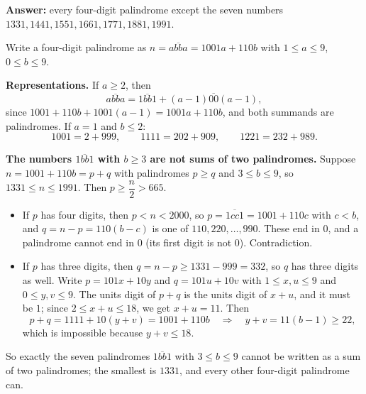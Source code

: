 \textbf{Answer:} every four-digit palindrome except the seven numbers $1331, 1441, 1551, 1661, 1771, 1881, 1991$.

Write a four-digit palindrome as $n=\overline{abba}=1001a+110b$ with $1\le a\le 9$, $0\le b\le 9$.

\textbf{Representations.} If $a\ge2$, then
\[
\overline{abba}=\overline{1bb1}+\overline{(a-1)00(a-1)},
\]
since $1001+110b+1001(a-1)=1001a+110b$, and both summands are palindromes. If $a=1$ and $b\le2$:
\[
1001=2+999,\qquad 1111=202+909,\qquad 1221=232+989 .
\]

\textbf{The numbers $\overline{1bb1}$ with $b\ge3$ are not sums of two palindromes.} Suppose $n=1001+110b=p+q$ with palindromes $p\ge q$ and $3\le b\le9$, so $1331\le n\le1991$. Then $p\ge\dfrac{n}{2}>665$.
\begin{itemize}
\item If $p$ has four digits, then $p<n<2000$, so $p=\overline{1cc1}=1001+110c$ with $c<b$, and $q=n-p=110(b-c)$ is one of $110,220,\dots,990$. These end in $0$, and a palindrome cannot end in $0$ (its first digit is not $0$). Contradiction.
\item If $p$ has three digits, then $q=n-p\ge1331-999=332$, so $q$ has three digits as well. Write $p=101x+10y$ and $q=101u+10v$ with $1\le x,u\le9$ and $0\le y,v\le9$. The units digit of $p+q$ is the units digit of $x+u$, and it must be $1$; since $2\le x+u\le18$, we get $x+u=11$. Then
\[
p+q=1111+10(y+v)=1001+110b\quad\Longrightarrow\quad y+v=11(b-1)\ge22,
\]
which is impossible because $y+v\le18$.
\end{itemize}
So exactly the seven palindromes $\overline{1bb1}$ with $3\le b\le9$ cannot be written as a sum of two palindromes; the smallest is $\boxed{1331}$, and every other four-digit palindrome can.
